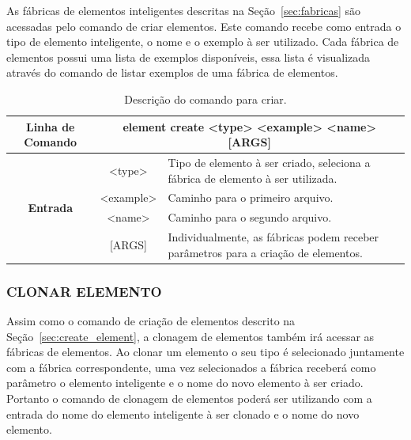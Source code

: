 \documentclass[a4paper,12pt]{monografia}
\theoremstyle{plain}
\theoremstyle{definition}
\theoremstyle{remark}
\begin{document}
As fábricas de elementos inteligentes descritas na Seção~\ref{sec:fabricas} são acessadas pelo comando de criar elementos. Este comando recebe como entrada o tipo de elemento inteligente, o nome e o exemplo à ser utilizado. Cada fábrica de elementos possui uma lista de exemplos disponíveis, essa lista é visualizada através do comando de listar exemplos de uma fábrica de elementos.

\begin{center}
\begin{table}[!htbp]
	\begin{tabular}{|c|c|m{}|}
		\hline
		\textbf{Linha de Comando} & \multicolumn{2}{c|}{element create <type> <example> <name> [ARGS]} \\
		\hline
		\multirow{4}{*}{\textbf{Entrada}} & <type> & Tipo de elemento à ser criado, seleciona a fábrica de elemento à ser utilizada. \\
		
		& <example> & Caminho para o primeiro arquivo. \\
		& <name> & Caminho para o segundo arquivo. \\
		& [ARGS] & Individualmente,  as fábricas podem receber parâmetros para a criação de elementos. \\
		\hline
	\end{tabular}
	\caption{Descrição do comando para criar.}
	\label{tab:create_element}
\end{table}
\end{center}

\subsubsection{CLONAR ELEMENTO}\label{sec:clone_element}

Assim como o comando de criação de elementos descrito na Seção~\ref{sec:create_element}, a clonagem de elementos também irá acessar as fábricas de elementos. Ao clonar um elemento o seu tipo é selecionado juntamente com a fábrica correspondente, uma vez selecionados a fábrica receberá como parâmetro o elemento inteligente e o nome do novo elemento à ser criado. Portanto o comando de clonagem de elementos poderá ser utilizando com a entrada do nome do elemento inteligente à ser clonado e o nome do novo elemento.
\end{document}
